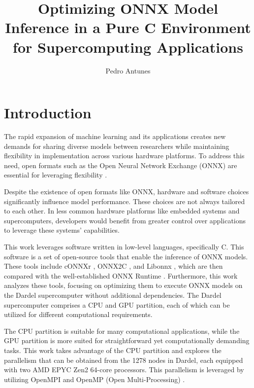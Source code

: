 \documentclass[fleqn,10pt]{olplainarticle}
\title{Optimizing ONNX Model Inference in a Pure C Environment for Supercomputing Applications}
\author[1]{Pedro Antunes}
\affil[1]{pedroa@kth.se}
\begin{document}
\flushbottom
\maketitle
\thispagestyle{empty}

\section{Introduction}
The rapid expansion of machine learning and its applications creates new demands for sharing diverse models between researchers while maintaining flexibility in implementation across various hardware platforms. To address this need, open formats such as the Open Neural Network Exchange (ONNX) are essential for leveraging flexibility \cite{baiONNXOpenNeural2019}.

Despite the existence of open formats like ONNX, hardware and software choices significantly influence model performance. These choices are not always tailored to each other. In less common hardware platforms like embedded systems and supercomputers, developers would benefit from greater control over applications to leverage these systems' capabilities.

This work leverages software written in low-level languages, specifically C. This software is a set of open-source tools that enable the inference of ONNX models. These tools include cONNXr \cite{revueltaCONNXr2024}, ONNX2C \cite{kraiskilONNX2C2024}, and Libonnx \cite{xbootLibonnxLightweightPortable2024}, which are then compared with the well-established ONNX Runtime \cite{developersONNXRuntime2021}. Furthermore, this work analyzes these tools, focusing on optimizing them to execute ONNX models on the Dardel supercomputer without additional dependencies. The Dardel supercomputer comprises a CPU and GPU partition, each of which can be utilized for different computational requirements.

The CPU partition is suitable for many computational applications, while the GPU partition is more suited for straightforward yet computationally demanding tasks. This work takes advantage of the CPU partition and explores the parallelism that can be obtained from the 1278 nodes in Dardel, each equipped with two AMD EPYC Zen2 64-core processors. This parallelism is leveraged by utilizing OpenMPI \cite{gabrielOpenMPIGoals2004} and OpenMP (Open Multi-Processing) \cite{dagumOpenMPIndustryStandard1998}.
\end{document}
